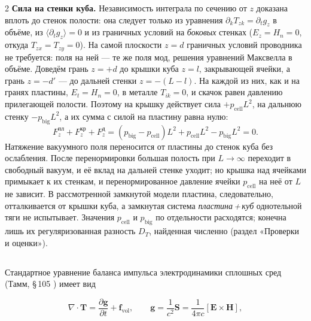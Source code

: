 \documentclass[twoside, 10pt]{article}
\def\myvspacebeforesubsection{-2.0mm}
\def\myvspaceaftersubsection{-2.5mm}
\begin{document}
\begin{multicols}{2}
\textbf{Сила на стенки куба.} Независимость интеграла по сечению от \(z\) доказана вплоть до стенок полости: она следует только из уравнения \(\partial_kT_{zk}=\partial_tg_z\) в объёме, из \(\langle\partial_tg_z\rangle=0\) и из граничных условий на \emph{боковых} стенках (\(E_z=H_n=0\), откуда \(T_{zx}=T_{zy}=0\)). На самой плоскости \(z=d\) граничных условий проводника не требуется: поля на ней --- те же поля мод, решения уравнений Максвелла в объёме. Доведём грань \(z=+d\) до крышки куба \(z=l\), закрывающей ячейки, а грань \(z=-d'\) --- до дальней стенки \(z=-(L-l)\). На каждой из них, как и на гранях пластины, \(E_t=H_n=0\), в металле \(T_{ik}=0\), и скачок равен давлению прилегающей полости. Поэтому на крышку действует сила \(+p_{\text{cell}}L^2\), на дальнюю стенку \(-p_{\text{big}}L^2\), а их сумма с силой на пластину равна нулю:
\[
F_z^{\text{пл}}+F_z^{\text{кр}}+F_z^{\text{д}}=(p_{\text{big}}-p_{\text{cell}})L^2+p_{\text{cell}}L^2-p_{\text{big}}L^2=0 .
\]
Натяжение вакуумного поля переносится от пластины до стенок куба без ослабления. После перенормировки большая полость при \(L\to\infty\) переходит в свободный вакуум, и её вклад на дальней стенке уходит; но крышка над ячейками примыкает к их стенкам, и перенормированное давление ячейки \(p_{\text{cell}}\) на неё от \(L\) не зависит. В рассмотренной замкнутой модели пластина, следовательно, отталкивается от крышки куба, а замкнутая система \emph{пластина\,+\,куб} однотельной тяги не испытывает. Значения \(p_{\text{cell}}\) и \(p_{\text{big}}\) по отдельности расходятся; конечна лишь их регуляризованная разность \(D_T\), найденная численно (раздел «Проверки и оценки»).

\vspace{\myvspacebeforesubsection}
\subsection*{}
\vspace{\myvspaceaftersubsection}


Стандартное уравнение баланса импульса электродинамики сплошных сред (Тамм, \S\,105
\cite{Tamm1957}) имеет вид

\end{multicols}
\[
\nabla\cdot\mathbf{T} = \frac{\partial\mathbf{g}}{\partial t} + \mathbf{f}_{\mathrm{vol}},
\qquad
\mathbf{g} = \frac{1}{c^2}\mathbf{S} = \frac{1}{4\pi c}[\mathbf{E}\times\mathbf{H}],
\]
\end{document}
